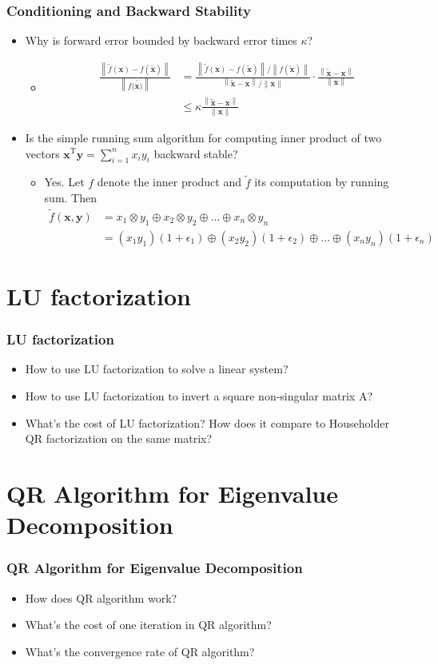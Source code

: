 \documentclass[10pt]{beamer}
\newcommand{\norm}[1]{\left\lVert#1\right\rVert}
\renewcommand{\vec}[1]{\boldsymbol{#1}}
\newcommand{\T}{\mathrm{T}}
\newcommand{\perturb}[1]{\tilde{#1}}
\newcommand{\subitem}[1]{\begin{itemize}\item #1\end{itemize}}
\begin{document}
\begin{frame}
  \frametitle{Conditioning and Backward Stability}
  \begin{itemize}[<+->]
    \item Why is forward error bounded by backward error times \(\kappa\)?
  \subitem{\begin{align*}\frac{\norm{\perturb{f}(\vec{x}) - f(\perturb{\vec{x}})}}{\norm{f(\perturb{\vec{x})}}} &= \frac{\norm{\perturb{f}(\vec{x}) - f(\perturb{\vec{x}})}/\norm{f(\perturb{\vec{x}})}}{\norm{\perturb{\vec{x}} - \vec{x}}/\norm{\vec{x}}}\cdot \frac{\norm{\perturb{\vec{x}} - \vec{x}}}{\norm{\vec{x}}}\\&\leq \kappa \frac{\norm{\perturb{\vec{x}} - \vec{x}}}{\norm{\vec{x}}}\end{align*}}
    \item Is the simple running sum algorithm for computing inner product of two vectors \(\vec{x}^{\T}\vec{y} = \sum_{i=1}^n x_i y_i\) backward stable?
  \subitem{Yes. Let \(f\) denote the inner product and \(\perturb{f}\) its computation by running sum. Then 
  \begin{align*}\perturb{f}\left(\vec{x}, \vec{y}\right)
    &= x_1 \otimes y_1 \oplus x_2 \otimes y_2 \oplus \hdots \oplus x_n \otimes y_n\\
    &= \left(x_1y_1\right)\left(1 + \epsilon_1\right) \oplus \left(x_2y_2\right)\left(1 + \epsilon_2\right) \oplus \hdots \oplus \left(x_ny_n\right)\left(1 + \epsilon_n\right)
  \end{align*}}
  \end{itemize}
\end{frame}

\section{LU factorization}
\begin{frame}
    \frametitle{LU factorization}
    \begin{itemize}[<+->]
      \item How to use LU factorization to solve a linear system?
      \item How to use LU factorization to invert a square non-singular matrix A?
      \item What’s the cost of LU factorization? How does it compare to Householder QR factorization on the same matrix?
    \end{itemize}
  \end{frame}

\section{QR Algorithm for Eigenvalue Decomposition}
\begin{frame}
  \frametitle{QR Algorithm for Eigenvalue Decomposition}
  \begin{itemize}[<+->]
    \item How does QR algorithm work?
    \item What’s the cost of one iteration in QR algorithm?
    \item What’s the convergence rate of QR algorithm?
  \end{itemize}
\end{frame}
\end{document}
